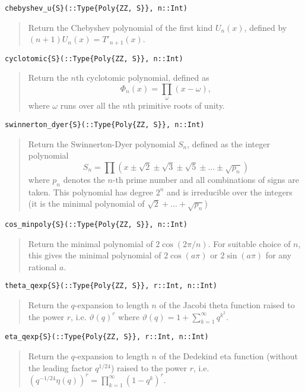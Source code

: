 \documentclass[a4paper,10pt]{article}
\newcommand{\desc}[1]{\vspace{-3mm}\begin{quote}#1\end{quote}}
\begin{document}
{{{\begin{lstlisting}
chebyshev_u{S}(::Type{Poly{ZZ, S}}, n::Int)
\end{lstlisting}

\desc{Return the Chebyshev polynomial of the first kind $U_n(x)$, defined by 
$(n+1) U_n(x) = T'_{n+1}(x)$.}

\begin{lstlisting}
cyclotomic{S}(::Type{Poly{ZZ, S}}, n::Int)
\end{lstlisting}

\desc{Return the $n$th cyclotomic polynomial, defined as
$$\Phi_n(x) = \prod_{\omega} (x-\omega),$$ where $\omega$ runs over all the 
$n$th primitive roots of unity.}

\begin{lstlisting}
swinnerton_dyer{S}(::Type{Poly{ZZ, S}}, n::Int)
\end{lstlisting}

\desc{Return the Swinnerton-Dyer polynomial $S_n$, defined as the integer 
polynomial $$S_n = \prod (x \pm \sqrt{2} \pm \sqrt{3}
\pm \sqrt{5} \pm \ldots \pm \sqrt{p_n})$$ where $p_n$ denotes the $n$-th prime 
number and all combinations of signs are taken. This polynomial has degree $2^n$
and is irreducible over the integers (it is the minimal polynomial of 
$\sqrt{2} + \ldots + \sqrt{p_n}$)}

\begin{lstlisting}
cos_minpoly{S}(::Type{Poly{ZZ, S}}, n::Int)
\end{lstlisting}

\desc{Return the minimal polynomial of $2 \cos(2 \pi / n)$. For suitable choice of 
$n$, this gives the minimal polynomial of $2 \cos(a \pi)$ or $2 \sin(a \pi)$ for any
rational $a$.}

\begin{lstlisting}
theta_qexp{S}(::Type{Poly{ZZ, S}}, r::Int, n::Int)
\end{lstlisting}

\desc{Return the $q$-expansion to length $n$ of the Jacobi theta function raised to 
the power $r$, i.e. $\vartheta(q)^r$ where 
$\vartheta(q) = 1 + \sum_{k=1}^{\infty} q^{k^2}$.}

\begin{lstlisting}
eta_qexp{S}(::Type{Poly{ZZ, S}}, r::Int, n::Int)
\end{lstlisting}

\desc{Return the $q$-expansion to length $n$ of the Dedekind eta function (without 
the leading factor $q^{1/24}$) raised to the power $r$, i.e. $(q^{-1/24} \eta(q))^r 
= \prod_{k=1}^{\infty} (1 - q^k)^r$.

}}}}
\end{document}
